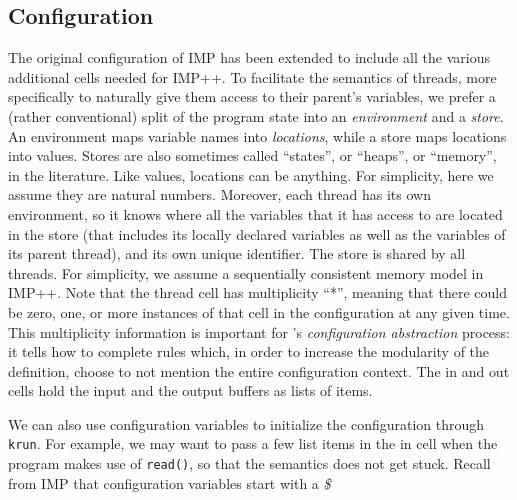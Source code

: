 \documentclass{article}
\begin{document}
\begin{kdefinition}
\begin{module}{}
\begin{kblock}[text]
 \subsection{Configuration}
The original configuration of IMP has been extended to include
all the various additional cells needed for IMP++\@.
To facilitate the semantics of threads, more specifically
to naturally give them access to their parent's variables, we prefer a
(rather conventional) split of the program state into an
{\em environment} and a {\em store}.  An environment maps
variable names into {\em locations}, while a store maps locations
into values.  Stores are also sometimes called ``states'', or
``heaps'', or ``memory'', in the literature.  Like values, locations
can be anything.  For simplicity, here we assume they are natural
numbers.  Moreover, each thread has its own environment, so it knows
where all the variables that it has access to are located in the store
(that includes its locally declared variables as well as the variables
of its parent thread), and its own unique identifier.  The store is
shared by all threads.  For simplicity, we assume a sequentially consistent
memory model in IMP++\@.  Note that the \textsf{thread} cell has multiplicity
``*'', meaning that there could be zero, one, or more instances of that cell
in the configuration at any given time.  This multiplicity information
is important for \K's {\em configuration abstraction} process: it tells
\K how to complete rules which, in order to increase the modularity of the
definition, choose to not mention the entire configuration context.
The \textsf{in} and \textsf{out} cells hold the input and the output
buffers as lists of items. \end{kblock}
\begin{kblock}[text]
 We can also use configuration variables to initialize
the configuration through \texttt{krun}.  For example, we may want to
pass a few list items in the \textsf{in} cell when the program makes
use of \texttt{read()}, so that the semantics does not get stuck.
Recall from IMP that configuration variables start with a \textit{\$}

\end{kblock}
\end{module}
\end{kdefinition}
\end{document}
